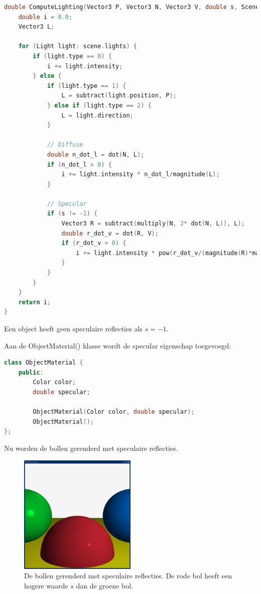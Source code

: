 \documentclass[12pt, a4paper]{article}
\begin{document}
\begin{lstlisting}[language=C++]
double ComputeLighting(Vector3 P, Vector3 N, Vector3 V, double s, Scene scene) {
    double i = 0.0;
    Vector3 L;

    for (Light light: scene.lights) {
        if (light.type == 0) {
            i += light.intensity;
        } else {
            if (light.type == 1) {
                L = subtract(light.position, P);
            } else if (light.type == 2) {
                L = light.direction;
            }

            // Diffuse
            double n_dot_l = dot(N, L);
            if (n_dot_l > 0) {
                i += light.intensity * n_dot_l/magnitude(L);
            }

            // Specular
            if (s != -1) {
                Vector3 R = subtract(multiply(N, 2* dot(N, L)), L);
                double r_dot_v = dot(R, V);
                if (r_dot_v > 0) {
                    i += light.intensity * pow(r_dot_v/(magnitude(R)*magnitude(V)), s);
                }
            }
        }
    }
    return i;
}
\end{lstlisting}

Een object heeft geen speculaire reflecties als $s=-1$. 

Aan de ObjectMaterial() klasse wordt de specular eigenschap toegevoegd:

\begin{lstlisting}[language=C++]
class ObjectMaterial {
    public: 
        Color color;
        double specular;

        ObjectMaterial(Color color, double specular);
        ObjectMaterial();
};
\end{lstlisting}

Nu worden de bollen gerenderd met speculaire reflecties.

\begin{figure}[H]
    \centering
    \includegraphics[width=0.50\textwidth]{renders/specular.png}
    \caption{De bollen gerenderd met speculaire reflecties. De rode bol heeft een hogere waarde $s$ dan de groene bol.}
    \label{fig:specular}
\end{figure}
\end{document}
